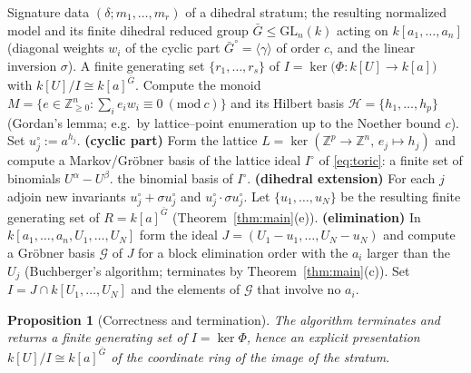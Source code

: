 \documentclass{amsart}
\newtheorem{proposition}[theorem]{Proposition}
\theoremstyle{definition}
\begin{document}
\begin{algorithm}[h]
\caption{Generators of the dihedral relation ideal $I$ on a stratum}
\begin{algorithmic}[1]
\Require Signature data $(\delta;m_1,\dots,m_r)$ of a dihedral stratum; the
resulting normalized model and its finite dihedral reduced group
$\bar G\le\mathrm{GL}_n(k)$ acting on $k[a_1,\dots,a_n]$ (diagonal weights $w_i$
of the cyclic part $\bar G^{\circ}=\langle\gamma\rangle$ of order $c$, and the
linear inversion $\sigma$).
\Ensure A finite generating set $\{r_1,\dots,r_s\}$ of $I=\ker\bigl(\Phi:k[U]\to
k[a]\bigr)$ with $k[U]/I\cong k[a]^{\bar G}$.
\State Compute the monoid $M=\{e\in\mathbb{Z}_{\ge0}^n:\sum_i e_iw_i\equiv0\
(\mathrm{mod}\ c)\}$ and its Hilbert basis $\mathcal H=\{h_1,\dots,h_p\}$
(Gordan's lemma; e.g.\ by lattice--point enumeration up to the Noether bound
$c$). Set $u^{\circ}_j:=a^{h_j}$.
\State \textbf{(cyclic part)} Form the lattice
$L=\ker(\mathbb{Z}^p\to\mathbb{Z}^n,\,e_j\mapsto h_j)$ and compute a
Markov/Gr\"obner basis of the lattice ideal $I^{\circ}$ of \eqref{eq:toric}: a
finite set of binomials $U^{\alpha}-U^{\beta}$.
   \State \Return the binomial basis of $I^{\circ}$. 
\EndIf
\State \textbf{(dihedral extension)} For each $j$ adjoin new invariants
$u^{\circ}_j+\sigma u^{\circ}_j$ and $u^{\circ}_j\cdot\sigma u^{\circ}_j$. Let
$\{u_1,\dots,u_N\}$ be the resulting finite generating set of $R=k[a]^{\bar G}$
(Theorem~\ref{thm:main}(e)).
\State \textbf{(elimination)} In $k[a_1,\dots,a_n,U_1,\dots,U_N]$ form the ideal
$J=(U_1-u_1,\dots,U_N-u_N)$ and compute a Gr\"obner basis $\mathcal G$ of $J$ for
a block elimination order with the $a_i$ larger than the $U_j$ (Buchberger's
algorithm; terminates by Theorem~\ref{thm:main}(c)).
\State Set $I=J\cap k[U_1,\dots,U_N]$ and \Return the elements of $\mathcal G$ that
involve no $a_i$.
\end{algorithmic}
\end{algorithm}

\begin{proposition}[Correctness and termination]\label{prop:algo}
The algorithm terminates and returns a finite generating set of $I=\ker\Phi$, hence
an explicit presentation $k[U]/I\cong k[a]^{\bar G}$ of the coordinate ring of the
image of the stratum.
\end{proposition}
\end{document}
